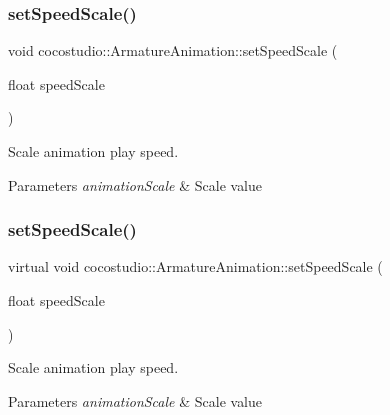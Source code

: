 \subsubsection{\texorpdfstring{set\+Speed\+Scale()}{setSpeedScale()}\hspace{0.1cm}{\footnotesize\ttfamily [1/2]}}
{\footnotesize\ttfamily void cocostudio\+::\+Armature\+Animation\+::set\+Speed\+Scale (\begin{DoxyParamCaption}\item[{float}]{speed\+Scale }\end{DoxyParamCaption})\hspace{0.3cm}{\ttfamily [virtual]}}

Scale animation play speed. 
\begin{DoxyParams}{Parameters}
{\em animation\+Scale} & Scale value \\
\hline
\end{DoxyParams}
\mbox{\label{classcocostudio_1_1ArmatureAnimation_aad5972a7b1df053d0606121bc9400a96}} 
\subsubsection{\texorpdfstring{set\+Speed\+Scale()}{setSpeedScale()}\hspace{0.1cm}{\footnotesize\ttfamily [2/2]}}
{\footnotesize\ttfamily virtual void cocostudio\+::\+Armature\+Animation\+::set\+Speed\+Scale (\begin{DoxyParamCaption}\item[{float}]{speed\+Scale }\end{DoxyParamCaption})\hspace{0.3cm}{\ttfamily [virtual]}}

Scale animation play speed. 
\begin{DoxyParams}{Parameters}
{\em animation\+Scale} & Scale value \\
\hline
\end{DoxyParams}
\mbox{\label{classcocostudio_1_1ArmatureAnimation_a6951f6f7fc812995f215ae7c253cc77c}} 
